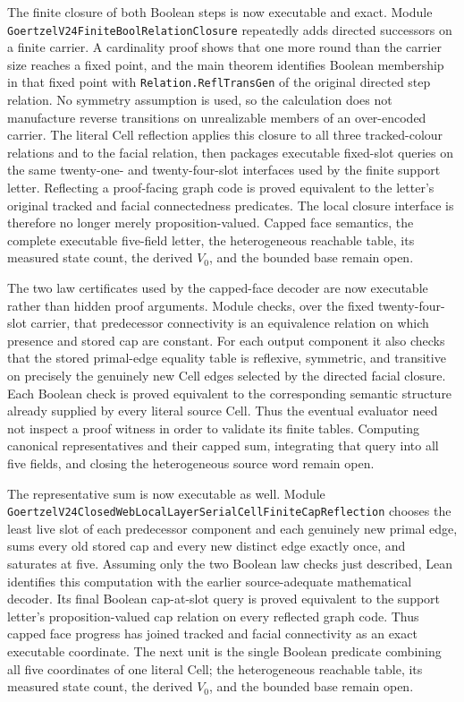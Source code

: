 \documentclass[11pt]{article}
\theoremstyle{definition}
\begin{document}
The finite closure of both Boolean steps is now executable and exact.  Module
\texttt{GoertzelV24FiniteBoolRelationClosure} repeatedly adds directed
successors on a finite carrier.  A cardinality proof shows that one more round
than the carrier size reaches a fixed point, and the main theorem identifies
Boolean membership in that fixed point with
\texttt{Relation.ReflTransGen} of the original directed step relation.  No
symmetry assumption is used, so the calculation does not manufacture reverse
transitions on unrealizable members of an over-encoded carrier.  The literal
Cell reflection applies this closure to all three tracked-colour relations and
to the facial relation, then packages executable fixed-slot queries on the
same twenty-one- and twenty-four-slot interfaces used by the finite support
letter.  Reflecting a proof-facing graph code is proved equivalent to the
letter's original tracked and facial connectedness predicates.  The local
closure interface is therefore no longer merely proposition-valued.  Capped
face semantics, the complete executable five-field letter, the heterogeneous
reachable table, its measured state count, the derived $V_0$, and the bounded
base remain open.

The two law certificates used by the capped-face decoder are now executable
rather than hidden proof arguments.  Module
checks, over the fixed twenty-four-slot carrier, that predecessor connectivity
is an equivalence relation on which presence and stored cap are constant.  For
each output component it also checks that the stored primal-edge equality
table is reflexive, symmetric, and transitive on precisely the genuinely new
Cell edges selected by the directed facial closure.  Each Boolean check is
proved equivalent to the corresponding semantic structure already supplied
by every literal source Cell.  Thus the eventual evaluator need not inspect a
proof witness in order to validate its finite tables.  Computing canonical
representatives and their capped sum, integrating that query into all five
fields, and closing the heterogeneous source word remain open.

The representative sum is now executable as well.  Module
\texttt{GoertzelV24ClosedWebLocalLayerSerialCellFiniteCapReflection} chooses
the least live slot of each predecessor component and each genuinely new
primal edge, sums every old stored cap and every new distinct edge exactly
once, and saturates at five.  Assuming only the two Boolean law checks just
described, Lean identifies this computation with the earlier source-adequate
mathematical decoder.  Its final Boolean cap-at-slot query is proved equivalent
to the support letter's proposition-valued cap relation on every reflected
graph code.  Thus capped face progress has joined tracked and facial
connectivity as an exact executable coordinate.  The next unit is the single
Boolean predicate combining all five coordinates of one literal Cell; the
heterogeneous reachable table, its measured state count, the derived $V_0$,
and the bounded base remain open.
\end{document}
